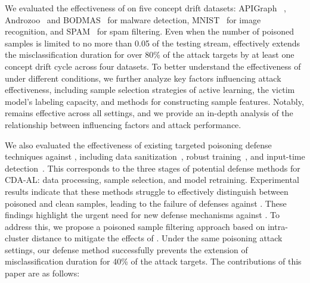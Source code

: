 We evaluated the effectiveness of \pandora on five concept drift datasets: APIGraph~\cite{2020-CCS-APIGraph} , Androzoo~\cite{2016-Androzoo} and BODMAS~\cite{2021-PE-malware-dataset} for malware detection, MNIST~\cite{2017-MINIST-dataset} for image recognition, and SPAM~\cite{2010-Spam-Emali-dataset} for spam filtering.
Even when the number of poisoned samples is limited to no more than 0.05 of the testing stream, \pandora effectively extends the misclassification duration for over 80\% of the attack targets by at least one concept drift cycle across four datasets.
To better understand the effectiveness of \pandora under different conditions, we further analyze key factors influencing attack effectiveness, including sample selection strategies of active learning, the victim model's labeling capacity, and methods for constructing sample features.
Notably, \pandora remains effective across all settings, and we provide an in-depth analysis of the relationship between influencing factors and attack performance.

We also evaluated the effectiveness of existing targeted poisoning defense techniques against \pandora, including data sanitization~\cite{chen2018detecting}, robust training~\cite{DFP}, and input-time detection~\cite{2023-ICCV-Trigger-Detect}.
This corresponds to the three stages of potential defense methods for CDA-AL: data processing, sample selection, and model retraining.
Experimental results indicate that these methods struggle to effectively distinguish between poisoned and clean samples, leading to the failure of defenses against \pandora.
These findings highlight the urgent need for new defense mechanisms against \pandora.
To address this, we propose a poisoned sample filtering approach based on intra-cluster distance to mitigate the effects of \pandora.
Under the same poisoning attack settings, our defense method successfully prevents the extension of misclassification duration for 40\% of the attack targets.
The contributions of this paper are as follows:

